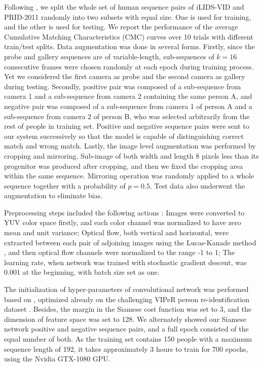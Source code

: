 \documentclass[10pt,twocolumn,letterpaper]{article}
\begin{document}
Following \cite{C_RNN}, we split the whole set of human sequence pairs of iLIDS-VID and PRID-2011 randomly into two subsets with equal size. One is used for training, and the other is used for testing. We report the performance of the average Cumulative Matching Characteristics (CMC) curves over 10 trials with different train/test splits. Data augmentation was done in several forms. Firstly, since the probe and gallery sequences are of variable-length, sub-sequences of $k = 16$ consecutive frames were chosen randomly at each epoch during training process. Yet we considered the first camera as probe and the second camera as gallery during testing. Secondly, positive pair was composed of a sub-sequence from camera 1 and a sub-sequence from camera 2 containing the same person A, and negative pair was composed of a sub-sequence from camera 1 of person A and a sub-sequence from camera 2 of person B, who was selected arbitrarily from the rest of people in training set.
Positive and negative sequence pairs were sent to our system successively so that the model is capable of distinguishing correct match and wrong match. Lastly, the image level augmentation was performed by cropping and mirroring. Sub-image of both width and length 8 pixels less than its progenitor was produced after cropping, and then we fixed the cropping area within the same sequence. Mirroring operation was randomly applied to a whole sequence together with a probability of $p = 0.5$. Test data also underwent the augmentation to eliminate bias.

Preprocessing steps included the following actions \cite{C_RNN}: Images were converted to YUV color space firstly, and each color channel was normalized to have zero mean and unit variance; Optical flow, both vertical and horizontal, were extracted between each pair of adjoining images using the Lucas-Kanade method \cite{Lucas-Kanade}, and then optical flow channels were normalized to the range -1 to 1; The learning rate, when network was trained with stochastic gradient descent, was 0.001 at the beginning, with batch size set as one. 
   
   The initialization of hyper-parameters of convolutional network was performed based on \cite{C_RNN}, optimized already on the challenging VIPeR person re-identification dataset \cite{parameter_initialization}. Besides, the margin in the Siamese cost function was set to 3, and the dimension of feature space was set to 128. We alternately showed our Siamese network positive and negative sequence pairs, and a full epoch consisted of the equal number of both. As the training set contains 150 people with a maximum sequence length of 192, it takes approximately 3 hours to train for 700 epochs, using the Nvidia GTX-1080 GPU.
\end{document}
